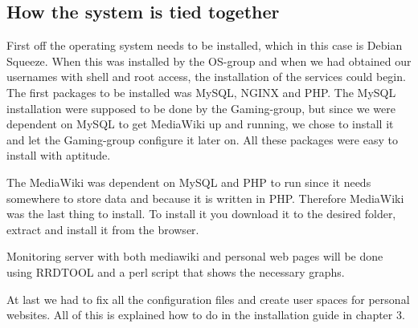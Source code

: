 \subsection{How the system is tied together}
First off the operating system needs to be installed, which in this case is Debian Squeeze. When this was installed by the OS-group and when we had obtained our usernames with shell and root access, the installation of the services could begin. The first packages to be installed was MySQL, NGINX and PHP. The MySQL installation were supposed to be done by the Gaming-group, but since we were dependent on MySQL to get MediaWiki up and running, we chose to install it and let the Gaming-group configure it later on. All these packages were easy to install with aptitude.

The MediaWiki was dependent on MySQL and PHP to run since it needs somewhere to store data and because it is written in PHP. Therefore MediaWiki was the last thing to install. To install it you download it to the desired folder, extract and install it from the browser.

Monitoring server with both mediawiki and personal web pages will be done using RRDTOOL and a perl script that shows the necessary graphs.

At last we had to fix all the configuration files and create user spaces for personal websites. All of this is explained how to do in the installation guide in chapter 3.

